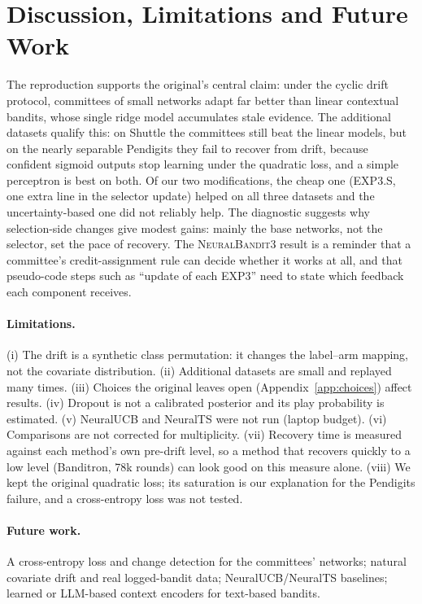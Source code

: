 \documentclass[sigconf]{acmart}
\newcommand{\NB}{\textsc{NeuralBandit}}
\begin{document}
\section{Discussion, Limitations and Future Work}
The reproduction supports the original's central claim: under the cyclic drift protocol, committees of small
networks adapt far better than linear contextual bandits, whose single ridge model accumulates stale evidence. The additional datasets qualify this: on Shuttle the committees still beat the linear models, but on
the nearly separable Pendigits they fail to recover from drift, because confident sigmoid outputs stop learning under
the quadratic loss, and a simple perceptron is best on both. Of our two modifications, the cheap one (EXP3.S, one
extra line in the selector update) helped on all three datasets and the uncertainty-based one did not reliably help. The diagnostic suggests why selection-side changes give modest gains: mainly the base networks, not the selector,
set the pace of recovery. The \NB{}3 result is a reminder that a committee's credit-assignment rule can decide
whether it works at all, and that pseudo-code steps such as ``update of each EXP3'' need to state which feedback each component receives.
\paragraph{Limitations.} (i) The drift is a synthetic class permutation: it changes the label--arm mapping, not the
covariate distribution. (ii) Additional datasets are small and replayed many times. (iii) Choices the original leaves
open (Appendix~\ref{app:choices}) affect results. (iv) Dropout is not a calibrated posterior and its play probability
is estimated. (v) NeuralUCB and NeuralTS were not run (laptop budget). (vi) Comparisons are not corrected for
multiplicity. (vii) Recovery time is measured against each method's own pre-drift level, so a method that recovers
quickly to a low level (Banditron, 78k rounds) can look good on this measure alone. (viii) We kept the original
quadratic loss; its saturation is our explanation for the Pendigits failure, and a cross-entropy loss was not tested.
\paragraph{Future work.} A cross-entropy loss and change
detection for the committees' networks; natural covariate drift and real logged-bandit data; NeuralUCB/NeuralTS baselines; learned or LLM-based context encoders for text-based bandits.
\end{document}
